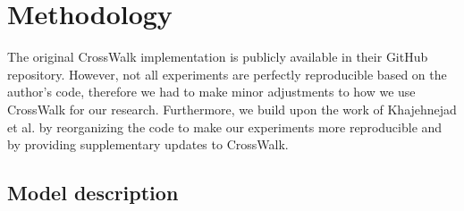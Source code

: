 


\section{Methodology}
\label{sec:method}
The original CrossWalk implementation is publicly available in their GitHub repository. However, not all experiments are perfectly reproducible based on the author's code, therefore we had to make minor adjustments to how we use CrossWalk for our research. Furthermore, we build upon the work of Khajehnejad et al. \cite{crosswalk} by reorganizing the code to make our experiments more reproducible and by providing supplementary updates to CrossWalk.


\subsection{Model description}


